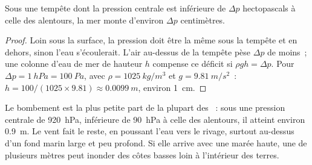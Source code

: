 \begin{proposition}\label{prop:g10:storms-and-cyclones:bulge}
Sous une tempête dont la pression centrale est inférieure de $\Delta p$
hectopascals à celle des alentours, la mer monte d'environ $\Delta p$
centimètres.
\end{proposition}

\begin{proof}
Loin sous la surface, la pression doit être la même sous la tempête et en
dehors, sinon l'eau s'écoulerait. L'air au-dessus de la tempête pèse
$\Delta p$ de moins~; une colonne d'eau de mer de hauteur $h$ compense ce
déficit si
$\rho g h = \Delta p$. Pour $\Delta p = \qty{1}{hPa} = \qty{100}{Pa}$, avec
$\rho = \qty{1025}{kg/m^3}$ et $g = \qty{9.81}{m/s^2}$~: $h = 100/(1025
\times 9.81) \approx \qty{0.0099}{m}$, environ \qty{1}{cm}.
\end{proof}

Le bombement est la plus petite part de la plupart des ~:
sous une pression centrale de \qty{920}{hPa}, inférieure de \qty{90}{hPa}
à celle des alentours, il atteint environ \qty{0.9}{m}. Le vent fait le
reste, en poussant l'eau vers le rivage, surtout au-dessus d'un fond marin
large et peu profond. Si elle arrive avec une marée haute, une  de plusieurs mètres peut inonder des côtes basses loin à
l'intérieur des terres.

